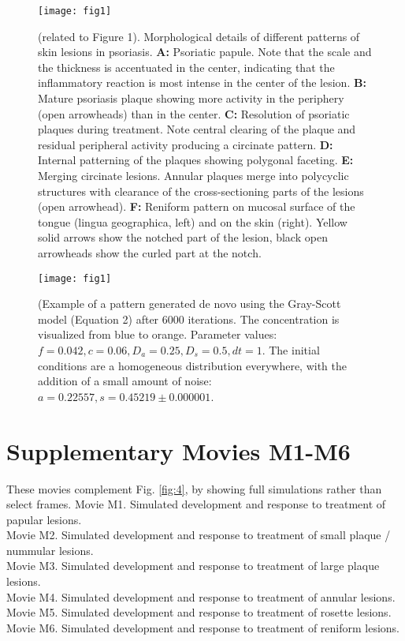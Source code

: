 \begin{figure}[hb]
  \centering
  \texttt{[image: fig1]}
  \caption{(related to Figure 1). Morphological details of different patterns of skin lesions in psoriasis. \textbf{A:} Psoriatic papule. Note that the scale and the thickness is accentuated in the center, indicating that the inflammatory reaction is most intense in the center of the lesion. \textbf{B:} Mature psoriasis plaque showing more activity in the periphery (open arrowheads) than in the center. \textbf{C:} Resolution of psoriatic plaques during treatment. Note central clearing of the plaque and residual peripheral activity producing a circinate pattern. \textbf{D:} Internal patterning of the plaques showing polygonal faceting. \textbf{E:} Merging circinate lesions. Annular plaques merge into polycyclic structures with clearance of the cross-sectioning parts of the lesions (open arrowhead). \textbf{F:} Reniform pattern on mucosal surface of the tongue (lingua geographica, left) and on the skin (right). Yellow solid arrows show the notched part of the lesion, black open arrowheads show the curled part at the notch.}
  \label{fig:S1}
\end{figure}

\begin{figure}[hb]
  \centering
  \texttt{[image: fig1]}
  \caption{(Example of a pattern generated de novo using the Gray-Scott model (Equation 2) after 6000 iterations. The concentration is visualized from blue to orange. Parameter values: $f=0.042, c=0.06,  D_a=0.25, D_s=0.5, dt=1$. The initial conditions are a homogeneous distribution everywhere, with the addition of a small amount of noise: $a=0.22557, s=0.45219±0.000001$.}
  \label{fig:S2}
\end{figure}

\section{Supplementary Movies M1-M6}
These movies complement Fig. \ref{fig:4}, by showing full simulations rather than select frames.
Movie M1. Simulated development and response to treatment of papular lesions. \\
Movie M2. Simulated development and response to treatment of small plaque / nummular lesions. \\
Movie M3. Simulated development and response to treatment of large plaque lesions. \\
Movie M4. Simulated development and response to treatment of annular lesions. \\
Movie M5. Simulated development and response to treatment of rosette lesions. \\
Movie M6. Simulated development and response to treatment of reniform lesions.